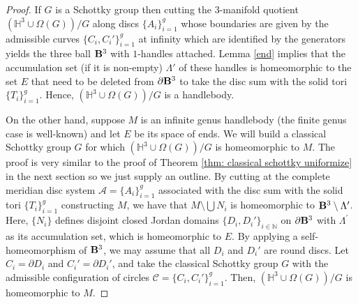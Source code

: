 \documentclass[12pt]{amsart}
\theoremstyle{plain}
\begin{document}
\begin{proof} 
If $G$ is a Schottky group then cutting the $3$-manifold quotient 
$\left(\mathbb{H}^{3} \cup \Omega (G) \right)/G$ along discs $\{A_i\}_{i=1}^{g}$
whose boundaries are given by the admissible curves $\{C_i,C_i'\}_{i=1}^g$
at infinity which are identified by the generators yields the three ball ${\bf B}^3$ with $1$-handles attached. 
Lemma \ref{end} implies that the accumulation set (if it is non-empty)
$\Lambda'$ of these handles is homeomorphic to the set $E$ that need to be deleted from
$\partial {\bf B}^{3}$ to take the disc sum with the solid tori $\{T_i\}_{i=1}^g$. 
Hence, $\left(\mathbb{H}^{3} \cup \Omega (G) \right)/G$ is a handlebody. 

On the other hand, suppose $M$ is an infinite genus handlebody (the finite genus  case is well-known)
and let $E$ be its space of ends. 
We will build a classical Schottky group $G$ for which $\left(\mathbb{H}^{3} \cup \Omega (G) \right)/G$ is homeomorphic to $M$.
The proof is very similar to the proof of Theorem \ref{thm: classical schottky uniformize} in the next section 
so we just supply an outline.  
By cutting at the complete meridian disc system $\mathcal{A}=\{A_i\}_{i=1}^{g}$ associated with the disc sum 
with the solid tori $\{T_i\}_{i=1}^{g}$ constructing $M$, we have that
$M \setminus \bigcup N_i$ is homeomorphic to ${\bf B}^3 \setminus \Lambda^{\prime}$. Here,
$\{N_i\}$ defines disjoint closed Jordan domains $\{D_i,D_i'\}_{i \in \mathbb N}$ on $\partial {\bf B}^3$ with
$\Lambda^{\prime}$ as its accumulation set, which is homeomorphic to $E$. By applying a self-homeomorphism of
${\bf B}^3$, we may assume that all $D_i$ and $D_i'$ are round discs.
Let $C_i=\partial D_i$ and $C_i'=\partial D_i'$, and take the classical Schottky
group $G$ with the admissible configuration of circles $\mathcal C=\{C_i,C_i'\}_{i=1}^g$.
Then,
$\left(\mathbb{H}^{3} \cup \Omega (G) \right)/G$ is homeomorphic to $M$.
\end{proof}

 
\end{document}
